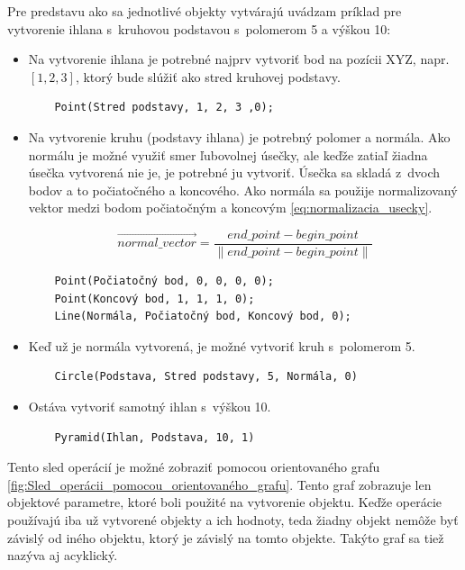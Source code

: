 Pre predstavu ako sa jednotlivé objekty vytvárajú uvádzam príklad pre vytvorenie ihlana s~kruhovou podstavou s~polomerom 5 a výškou 10:
\begin{itemize}
    \item Na vytvorenie ihlana je potrebné najprv vytvoriť bod na pozícii XYZ, napr. $\left [ 1, 2, 3 \right ]$, ktorý bude slúžiť ako stred kruhovej podstavy.
	\begin{lstlisting}
	Point(Stred podstavy, 1, 2, 3 ,0);
	\end{lstlisting}
	\item Na vytvorenie kruhu (podstavy ihlana) je potrebný polomer a normála. Ako normálu je možné využiť smer ľubovolnej úsečky, ale keďže zatiaľ žiadna úsečka vytvorená nie je, je potrebné ju vytvoriť. Úsečka sa skladá z~dvoch bodov a to počiatočného a koncového. Ako normála sa použije normalizovaný vektor medzi bodom počiatočným a koncovým \ref{eq:normalizacia_usecky}.

	\begin{equation}
		\overrightarrow{normal\_vector}=
		\frac{end\_point - begin\_point}{
		\left \|  end\_point - begin\_point \right \|}
	\label{eq:normalizacia_usecky}
	\end{equation}

	\begin{lstlisting}
	Point(Počiatočný bod, 0, 0, 0, 0);
	Point(Koncový bod, 1, 1, 1, 0);
	Line(Normála, Počiatočný bod, Koncový bod, 0);
	\end{lstlisting}
	\item Keď už je normála vytvorená, je možné vytvoriť kruh s~polomerom 5.
	\begin{lstlisting}
	Circle(Podstava, Stred podstavy, 5, Normála, 0) 
	\end{lstlisting}
	\item Ostáva vytvoriť samotný ihlan s~výškou 10.
	\begin{lstlisting}
	Pyramid(Ihlan, Podstava, 10, 1)
	\end{lstlisting}
\end{itemize}


Tento sled operácií je možné zobraziť pomocou orientovaného grafu \ref{fig:Sled_operácii_pomocou_orientovaného_grafu}. Tento graf zobrazuje len objektové parametre, ktoré boli použité na vytvorenie objektu. Keďže operácie používajú iba už vytvorené objekty a ich hodnoty, teda žiadny objekt nemôže byť závislý od iného objektu, ktorý je závislý na tomto objekte. Takýto graf sa tiež nazýva aj acyklický. 


